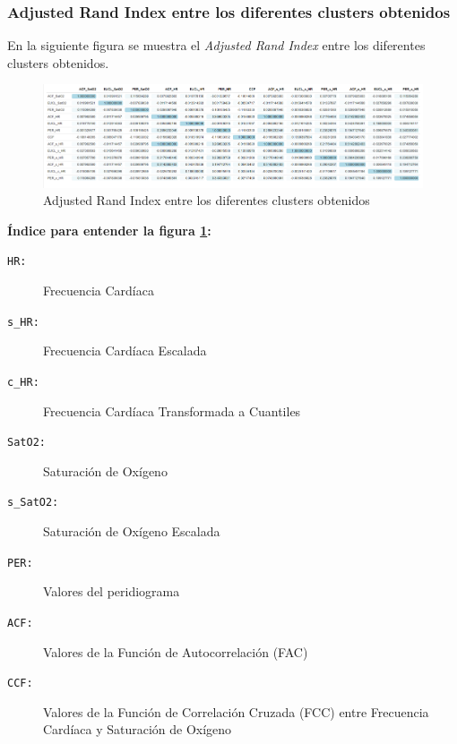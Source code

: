\newpage
\thispagestyle{empty}
\begin{landscape}

\subsubsection{Adjusted Rand Index entre los diferentes clusters obtenidos}

En la siguiente figura se muestra el \textit{Adjusted Rand Index} entre los diferentes clusters obtenidos. 

\begin{figure}[H]
    \centering
    \includegraphics[scale=0.65]{img/adj-rand-index.png}
    \caption{Adjusted Rand Index entre los diferentes clusters obtenidos}
    \label{fig:Adj-Rand-Index}
\end{figure}

\textbf{Índice para entender la figura \ref{fig:Adj-Rand-Index}:}
\begin{description}
  \item[\texttt{HR:}] Frecuencia Cardíaca
  \item[\texttt{s\_HR:}] Frecuencia Cardíaca Escalada
  \item[\texttt{c\_HR:}] Frecuencia Cardíaca Transformada a Cuantiles
  \item[\texttt{SatO2:}] Saturación de Oxígeno
  \item[\texttt{s\_SatO2:}] Saturación de Oxígeno Escalada
  \item[\texttt{PER:}] Valores del peridiograma
  \item[\texttt{ACF:}] Valores de la Función de Autocorrelación (FAC)
  \item[\texttt{CCF:}] Valores de la Función de Correlación Cruzada (FCC) entre Frecuencia Cardíaca y Saturación de Oxígeno
\end{description}


\end{landscape}
\restoregeometry



